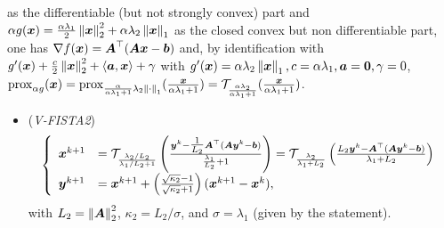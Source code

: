 as the differentiable (but not strongly convex) part and 
$\alpha g(\boldsymbol x) = \frac{\alpha\lambda_1}{2} \left\lVert\boldsymbol x\right\rVert_{2}^2 
+ \alpha\lambda_2 \left\lVert\boldsymbol x\right\rVert_{1}$ as the closed 
convex but non differentiable part, one has 
$\nabla f(\boldsymbol x) = \boldsymbol A^\top (\boldsymbol{Ax}-\boldsymbol b)$ and, 
by identification with $g'(\boldsymbol x) + \frac{c}{2} 
\left\lVert\boldsymbol x\right\rVert_{2}^2 + \langle \boldsymbol a, \boldsymbol x \rangle + \gamma$ with 
$g'(\boldsymbol x) = \alpha\lambda_2 \left\lVert\boldsymbol x\right\rVert_{1}, 
c=\alpha\lambda_1, \boldsymbol a=\boldsymbol 0, \gamma=0$, 
$\operatorname{prox}_{\alpha g}(\boldsymbol x) = 
\operatorname{prox}_{\frac{\alpha}{\alpha\lambda_1+1} \lambda_2 
\left\lVert\cdot\right\rVert_{1}} (\frac{\boldsymbol x}{\alpha\lambda_1+1}) = 
\mathcal T_{\frac{\alpha\lambda_2}{\alpha\lambda_1+1}} 
(\frac{\boldsymbol x}{\alpha\lambda_1+1})$.
%
\begin{itemize}
    \item (\emph{V-FISTA2})
    \begin{align*}
    \begin{split}
        \left\{
        \begin{array}{ll}
            \boldsymbol x^{k+1} &= \mathcal T_{\frac{\lambda_2/L_2}{
            \lambda_1/L_2 + 1}} 
            \left( \frac{\boldsymbol y^k - {\textstyle\frac{1}{L_2}} \boldsymbol A^\top  (\boldsymbol A
            \boldsymbol y^k-\boldsymbol b) }{\frac{\lambda_1}{L_2}+1} \right)
            = \mathcal T_{\frac{\lambda_2}{
                \lambda_1 + L_2}} 
                \left( \frac{L_2\boldsymbol y^k - \boldsymbol A^\top  (\boldsymbol A
                \boldsymbol y^k-\boldsymbol b) }{\lambda_1+L_2} \right) \\
            \boldsymbol y^{k+1} &= \boldsymbol x^{k+1} + \left( 
            \frac{\sqrt{\kappa_2}-1}{\sqrt{\kappa_2}+1} 
            \right) (\boldsymbol x^{k+1}- \boldsymbol x^k),
        \end{array}
        \right.
    \end{split}
    \end{align*}
    with $L_2=\left\lVert\boldsymbol A\right\rVert_{2}^2$, $\kappa_2=L_2/\sigma$, 
    and $\sigma=\lambda_1$ (given by the statement).
\end{itemize}

